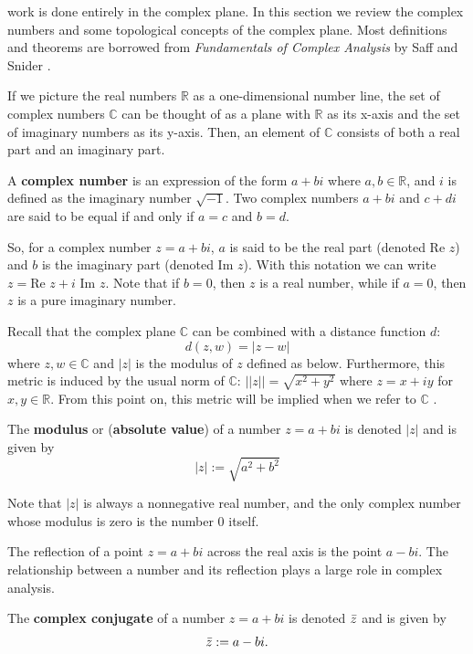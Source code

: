 \authorsetals work is done entirely in the complex plane.  In this section we review the complex numbers and some topological concepts of the complex plane.  Most definitions and theorems are borrowed from \textit{Fundamentals of Complex Analysis} by Saff and Snider \cite{Saff}.

If we picture the real numbers $\mathbb{R}$ as a one-dimensional number line, the set of complex numbers $\mathbb{C}$ can be thought of as a plane with $\mathbb{R}$ as its x-axis and the set of imaginary numbers as its y-axis.  Then, an element of $\mathbb{C}$  consists of both a real part and an imaginary part.

\begin{defn}
A \textbf{complex number} is an expression of the form $a + bi$ where $a, b \in \mathbb{R}$, and $i$ is defined as the imaginary number $\sqrt{-1}$.  Two complex numbers $a+bi$ and $c+di$ are said to be equal if and only if $a=c$ and $b=d$.
\end{defn}

So, for a complex number $z = a + bi$, $a$ is said to be the real part (denoted Re $z$) and $b$ is the imaginary part (denoted Im $z$).  With this notation we can write $z = \textrm{Re }z + i \textrm{ Im }z$.  Note that if $b=0$, then $z$ is a real number, while if $a=0$, then $z$ is a pure imaginary number.

Recall that the complex plane $\mathbb{C}$ can be combined with a distance function $d$:
\[d(z,w) = |z-w|\] where $z,w \in \mathbb{C}$ and $|z|$ is the modulus of $z$ defined as below.  Furthermore, this metric is induced by the usual norm of $\mathbb{C}$: $||z|| = \sqrt{x^2 + y^2}$ where $z = x+iy$ for $x,y \in \mathbb{R}$.  From this point on, this metric will be implied when we refer to $\mathbb{C}$ .

\begin{defn}
The \textbf{modulus} or (\textbf{absolute value}) of a number $z = a + bi$ is denoted $|z|$ and is given by
\[|z| := \sqrt{a^2 + b^2}\]
\end{defn}

Note that $|z|$ is always a nonnegative real number, and the only complex number whose modulus is zero is the number 0 itself.

The reflection of a point $z=a+bi$ across the real axis is the point $a-bi$.  The relationship between a number and its reflection plays a large role in complex analysis.

\begin{defn}
The \textbf{complex conjugate} of a number $z=a+bi$ is denoted $\bar{z}$ and is given by
\[\bar{z} := a-bi.\]
\end{defn}

